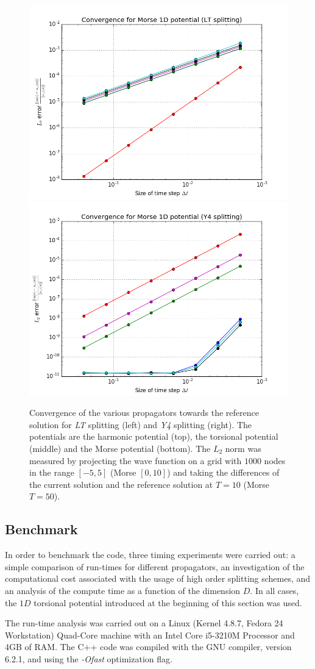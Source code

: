 \begin{figure}[ht]
	\includegraphics[width=.45\textwidth]{figures/convergence_morse_1D_lt.png}
	\includegraphics[width=.45\textwidth]{figures/convergence_morse_1D_y4.png}
	\caption{Convergence of the various propagators towards the reference solution for \emph{LT} splitting (left) and \emph{Y4} splitting (right). The potentials are the harmonic potential (top), the torsional potential (middle) and the Morse potential (bottom). The $L_2$ norm was measured by projecting the wave function on a grid with $1000$ nodes in the range $[-5,5]$ (Morse $[0,10]$) and taking the differences of the current solution and the reference solution at $T=10$ (Morse $T=50$).}
	\label{fig:error_analysis}
\end{figure}

\subsection{Benchmark}
\label{subsec:benchmark}
%
In order to benchmark the code, three timing experiments were carried out: a simple comparison of run-times for different propagators, an investigation of the computational cost associated with the usage of high order splitting schemes, and an analysis of the compute time as a function of the dimension $D$.
In all cases, the $1D$ torsional potential introduced at the beginning of this section was used.
\par\medskip
%
The run-time analysis was carried out on a Linux (Kernel 4.8.7, Fedora 24 Workstation) Quad-Core machine with an Intel Core i5-3210M Processor and
4GB of RAM. The C++ code was compiled with the GNU compiler, version 6.2.1, and using the \emph{-Ofast} optimization flag.



